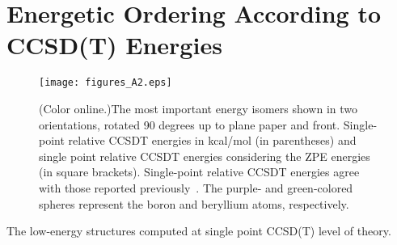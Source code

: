 \documentclass[prb,aps,preprint,showkeys,showpacs]{revtex4}
\begin{document}
\section{Energetic Ordering According to CCSD(T) Energies}
\label{appendix:b}
\begin{figure}[ht]
  \begin{center}
  \texttt{[image: figures\_A2.eps]}
  \caption{(Color online.)The most important energy isomers shown in two orientations, rotated 90 degrees up to plane paper and front. Single-point relative CCSDT energies in kcal/mol (in parentheses) and single point relative CCSDT energies considering the ZPE energies (in square brackets). Single-point relative CCSDT energies agree with those reported previously~\cite{Osvaldo}. The purple- and green-colored spheres represent the boron and beryllium atoms, respectively.}
  \label{ccsdt_geo}
  \end{center}
\end{figure}
The low-energy structures computed at single point CCSD(T) level of theory.
\newpage
\end{document}
